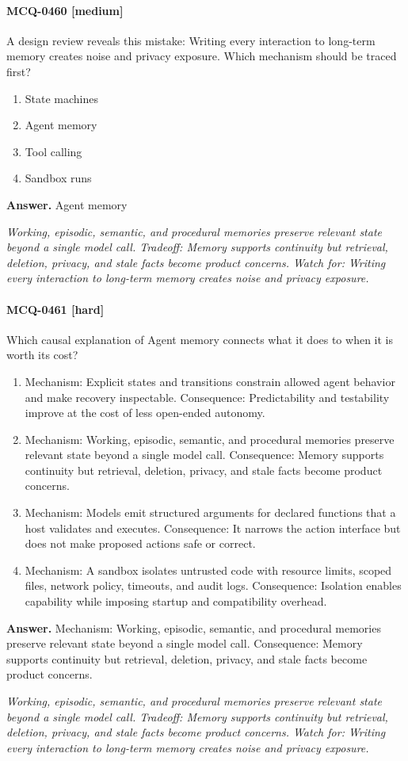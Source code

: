 \paragraph{MCQ-0460 [medium]} A design review reveals this mistake: Writing every interaction to long-term memory creates noise and privacy exposure. Which mechanism should be traced first?
\begin{enumerate}[label=\Alph*.]
\item State machines
\item Agent memory
\item Tool calling
\item Sandbox runs
\end{enumerate}
\noindent\textbf{Answer.} Agent memory
\par\textit{Working, episodic, semantic, and procedural memories preserve relevant state beyond a single model call. Tradeoff: Memory supports continuity but retrieval, deletion, privacy, and stale facts become product concerns. Watch for: Writing every interaction to long-term memory creates noise and privacy exposure.}
\paragraph{MCQ-0461 [hard]} Which causal explanation of Agent memory connects what it does to when it is worth its cost?
\begin{enumerate}[label=\Alph*.]
\item Mechanism: Explicit states and transitions constrain allowed agent behavior and make recovery inspectable. Consequence: Predictability and testability improve at the cost of less open-ended autonomy.
\item Mechanism: Working, episodic, semantic, and procedural memories preserve relevant state beyond a single model call. Consequence: Memory supports continuity but retrieval, deletion, privacy, and stale facts become product concerns.
\item Mechanism: Models emit structured arguments for declared functions that a host validates and executes. Consequence: It narrows the action interface but does not make proposed actions safe or correct.
\item Mechanism: A sandbox isolates untrusted code with resource limits, scoped files, network policy, timeouts, and audit logs. Consequence: Isolation enables capability while imposing startup and compatibility overhead.
\end{enumerate}
\noindent\textbf{Answer.} Mechanism: Working, episodic, semantic, and procedural memories preserve relevant state beyond a single model call. Consequence: Memory supports continuity but retrieval, deletion, privacy, and stale facts become product concerns.
\par\textit{Working, episodic, semantic, and procedural memories preserve relevant state beyond a single model call. Tradeoff: Memory supports continuity but retrieval, deletion, privacy, and stale facts become product concerns. Watch for: Writing every interaction to long-term memory creates noise and privacy exposure.}
